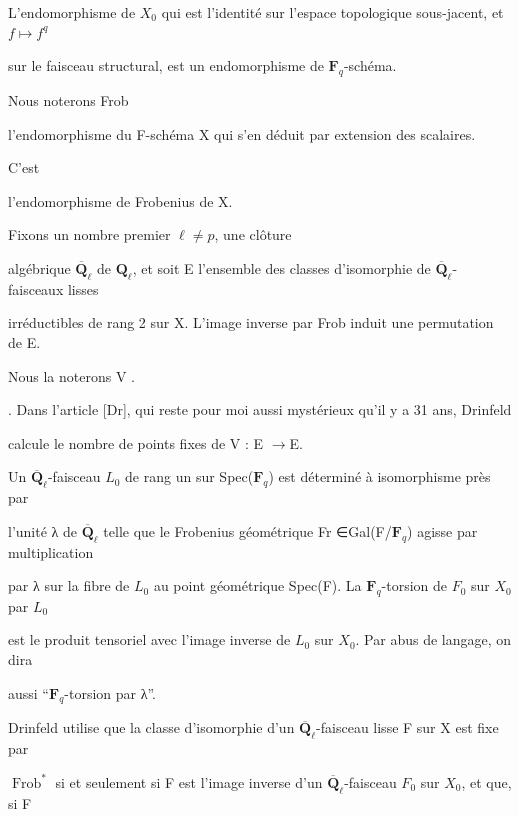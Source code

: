 \documentclass[11pt]{article}
\begin{document}
\noindent L’endomorphisme de \(X_0\) qui est l’identité sur l’espace topologique sous-jacent, et \(f\mapsto f^q\)\par
\noindent sur le faisceau structural, est un endomorphisme de \(\mathbf F_q\)-schéma.\par
\noindent Nous noterons Frob\par
\noindent l’endomorphisme du F-schéma X qui s’en déduit par extension des scalaires.\par
\noindent C’est\par
\noindent l’endomorphisme de Frobenius de X.\par
\noindent Fixons un nombre premier \(\ell\ne p\), une clôture\par
\noindent algébrique \(\overline{\mathbf Q}_{\ell}\) de \(\mathbf Q_{\ell}\), et soit E l’ensemble des classes d’isomorphie de \(\overline{\mathbf Q}_{\ell}\)-faisceaux lisses\par
\noindent irréductibles de rang 2 sur X. L’image inverse par Frob induit une permutation de E.\par
\noindent Nous la noterons V .\par
{}. Dans l’article [Dr], qui reste pour moi aussi mystérieux qu’il y a 31 ans, Drinfeld\par
\noindent calcule le nombre de points fixes de V : E \(\to\)E.\par
\noindent Un \(\overline{\mathbf Q}_{\ell}\)-faisceau \(L_0\) de rang un sur Spec(\(\mathbf F_q\)) est déterminé à isomorphisme près par\par
\noindent l’unité λ de \(\overline{\mathbf Q}_{\ell}\) telle que le Frobenius géométrique Fr ∈Gal(F/\(\mathbf F_q\)) agisse par multiplication\par
\noindent par λ sur la fibre de \(L_0\) au point géométrique Spec(F). La \(\mathbf F_q\)-torsion de \(F_0\) sur \(X_0\) par \(L_0\)\par
\noindent est le produit tensoriel avec l’image inverse de \(L_0\) sur \(X_0\). Par abus de langage, on dira\par
\noindent aussi “\(\mathbf F_q\)-torsion par λ”.\par
\medskip
\noindent Drinfeld utilise que la classe d’isomorphie d’un \(\overline{\mathbf Q}_{\ell}\)-faisceau lisse F sur X est fixe par\par
\noindent \(\operatorname{Frob}^*\) si et seulement si F est l’image inverse d’un \(\overline{\mathbf Q}_{\ell}\)-faisceau \(F_0\) sur \(X_0\), et que, si F\par
\end{document}
